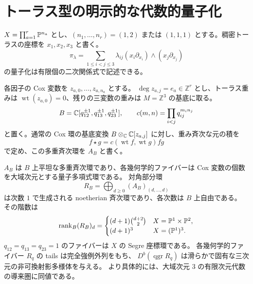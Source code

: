 \section{トーラス型の明示的な代数的量子化}
\label{sec:toric-quantization}

$X=\prod_{a=1}^r\mathbb P^{n_a}$ とし、$(n_1,\ldots,n_r)=(1,2)$ または
$(1,1,1)$ とする。稠密トーラスの座標を $x_1,x_2,x_3$ と書く。
\[
 \pi_\lambda=\sum_{1\leq i<j\leq3}\lambda_{ij}
 (x_i\partial_{x_i})\wedge(x_j\partial_{x_j})
\]
の量子化は有限個の二次関係式で記述できる。

各因子の Cox 変数を $z_{a,0},\ldots,z_{a,n_a}$ とする。
$\deg z_{a,j}=e_a\in\mathbb Z^r$ とし、トーラス重みは
$\operatorname{wt}(z_{a,0})=0$、残りの三変数の重みは
$M=\mathbb Z^3$ の基底に取る。
\[
 B=\mathbb C[q_{12}^{\pm1},q_{13}^{\pm1},q_{23}^{\pm1}],\qquad
 c(m,n)=\prod_{i<j}q_{ij}^{m_i n_j}
\]
と置く。通常の Cox 環の基底変換
$B\otimes_\mathbb C\mathbb C[z_{a,j}]$ に対し、重み斉次な元の積を
\[
 f\star g=c(\operatorname{wt}f,\operatorname{wt}g)fg
 \tag{*}
\]
で定め、この多重斉次環を $A_B$ と書く。

\begin{proposition}\label{prop:toric-algebraic}
$A_B$ は $B$ 上平坦な多重斉次環であり、各幾何学的ファイバーは
Cox 変数の個数を大域次元とする量子多項式環である。
対角部分環
\[
 R_B=\bigoplus_{d\geq0}(A_B)_{(d,\ldots,d)}
\]
は次数 $1$ で生成される noetherian 斉次環であり、各次数は $B$ 上自由である。
その階数は
\[
 \operatorname{rank}_B(R_B)_d=
 \begin{cases}
 (d+1)\binom{d+2}{2}&X=\mathbb P^1\times\mathbb P^2,\\
 (d+1)^3&X=(\mathbb P^1)^3.
 \end{cases}
\]
$q_{12}=q_{13}=q_{23}=1$ のファイバーは $X$ の Segre 座標環である。
各幾何学的ファイバー $R_q$ の tails は完全強例外列をもち、
$D^b(\operatorname{qgr}R_q)$ は滑らかで固有な三次元の非可換射影多様体を与える。
より具体的には、大域次元 $3$ の有限次元代数の導来圏に同値である。
\end{proposition}

